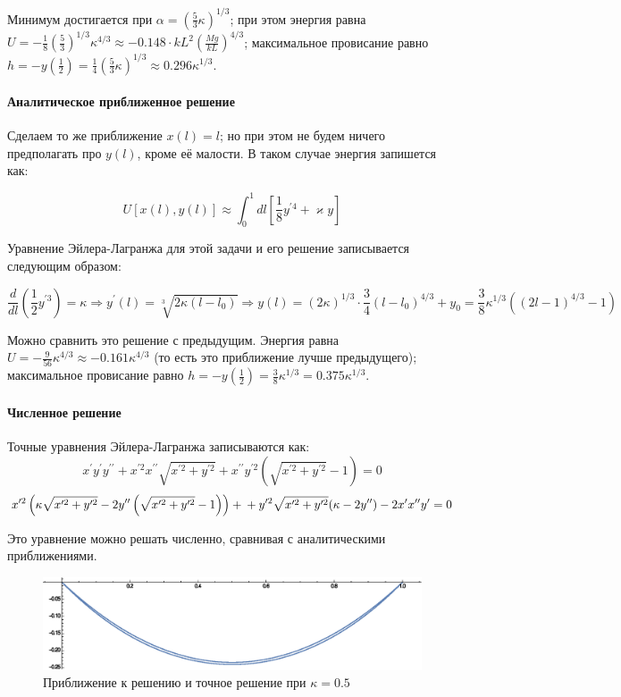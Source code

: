 \documentclass[a4paper,12pt]{article}
\begin{document}
\noindent
Минимум достигается при $\alpha=\left(\frac{5}{3}\kappa\right)^{1/3}$;
при этом энергия равна $U=-\frac{1}{8}\left(\frac{5}{3}\right)^{1/3}\kappa{}^{4/3}\approx-0.148\cdot kL^{2}\left(\frac{Mg}{kL}\right)^{4/3}$;
максимальное провисание равно $h=-y(\frac{1}{2})=\frac{1}{4}\left(\frac{5}{3}\kappa\right)^{1/3}\approx0.296\kappa^{1/3}$.


\paragraph{Аналитическое приближенное решение}

Сделаем то же приближение $x(l)=l$; но при этом не будем ничего предполагать
про $y(l)$, кроме её малости. В таком случае энергия запишется как:

\[
U[x(l),y(l)]\approx\int_{0}^{1}dl\left[\frac{1}{8}y^{\prime4}+\varkappa y\right]
\]

\noindent
Уравнение Эйлера-Лагранжа для этой задачи и его решение записывается
следующим образом:

\[
\frac{d}{dl}\left(\frac{1}{2}y^{\prime3}\right)=\kappa\Rightarrow y^{\prime}(l)=\sqrt[3]{2\kappa(l-l_{0})}
\Rightarrow
y(l)=(2\kappa)^{1/3}\cdot\frac{3}{4}(l-l_{0})^{4/3}+y_{0}=\frac{3}{8}\kappa^{1/3}\left((2l-1)^{4/3}-1\right)
\]

\noindent
Можно сравнить это решение с предыдущим. Энергия равна $U=-\frac{9}{56}\kappa^{4/3}\approx-0.161\kappa^{4/3}$
(то есть это приближение лучше предыдущего); максимальное провисание
равно $h=-y(\frac{1}{2})=\frac{3}{8}\kappa^{1/3}=0.375\kappa^{1/3}$.


\paragraph{Численное решение}

Точные уравнения Эйлера-Лагранжа записываются как:
\[
x^{\prime}y^{\prime}y^{\prime\prime}+x^{\prime2}x^{\prime\prime}\sqrt{x^{\prime2}+y^{\prime2}}+x^{\prime\prime}y^{\prime2}\left(\sqrt{x^{\prime2}+y^{\prime2}}-1\right) =0
\]
\[
x^{\prime2}\left(\kappa\sqrt{x^{\prime2}+y^{\prime2}}-2y^{\prime\prime}\left(\sqrt{x^{\prime2}+y^{\prime2}}-1\right)\right)+\\
+y^{\prime2}\sqrt{x^{\prime2}+y^{\prime2}}(\kappa-2y^{\prime\prime})-2x^{\prime}x^{\prime\prime}y^{\prime} =0
\]

\noindent
Это уравнение можно решать численно, сравнивая с аналитическими приближениями.

\begin{figure}[h]
\caption{Приближение к решению и точное решение при $\kappa=0.5$}
\centering
\includegraphics[width=0.8\columnwidth]{static.eps}
\end{figure}
\end{document}
